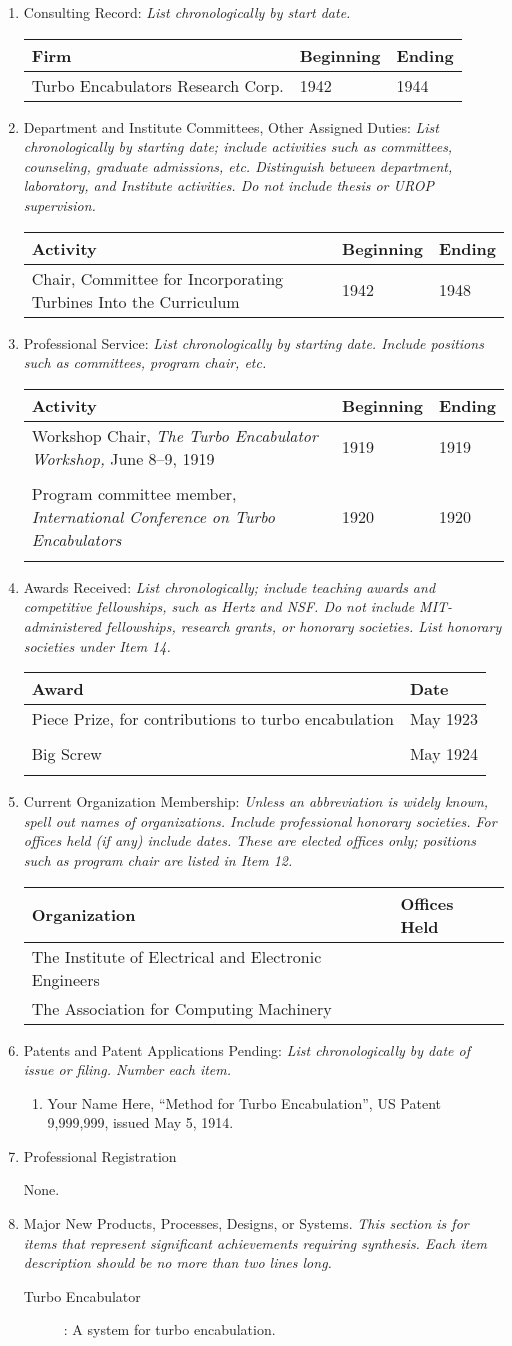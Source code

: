 \documentclass[12pt]{article}
\newcommand{\consultingrecord}{
%
Turbo Encabulators Research Corp. & 1942 & 1944 \\
}
\newcommand{\mitservice}{
Chair, Committee for Incorporating Turbines Into the Curriculum & 1942 & 1948 \\
}
\newcommand{\profservice}{

Workshop Chair, {\em The Turbo Encabulator Workshop,} June 8--9, 1919 & 1919 & 1919  \\\\
Program committee member, {\em International Conference on Turbo Encabulators} & 1920 & 1920 \\\\
}
\newcommand{\awardsreceived}{
Piece Prize, for contributions to turbo encabulation & May 1923 \\\\
Big Screw & May 1924 \\\\
}
\newcommand{\organizations}{
Organization & Offices Held\\\hline%
The Institute of Electrical and Electronic Engineers & \\
The Association for Computing Machinery & \\
}
\newcommand{\patents}{
\begin{enumerate}
\item Your Name Here, ``Method for Turbo Encabulation'', US Patent 9,999,999,
  issued May 5, 1914.
\end{enumerate}

}
\newcommand{\professionalregistration}{None.}
\newcommand{\majorproducts}{
\begin{description}
\item[Turbo Encabulator]: A system for turbo encabulation.
\end{description}

}
\newcommand{\littlenote}[1]{\emph{\footnotesize #1}}
\newcommand{\standardtwotab}[1]{
\noindent
{\small
\begin{longtable}{p{3.6in}p{1.6in}}
#1
\end{longtable}
}
}
\newcommand{\standardthreetab}[1]{
\noindent
\hspace{-0.4in}
{\small
\begin{longtable}{>{\raggedright}p{4.0in}p{.9in}p{.9in}}
#1
\end{longtable}
}
}
\begin{document}
\begin{enumerate}
\item Consulting Record: \littlenote{List chronologically by start date.}

\standardthreetab{
Firm & Beginning & Ending\\\hline%
\consultingrecord}

\item Department and Institute Committees, Other Assigned Duties:
  \littlenote{List chronologically by starting date; include
  activities such as committees, counseling, graduate admissions,
  etc.  Distinguish between department, laboratory, and Institute
  activities.  Do not include thesis or UROP supervision.}

\standardthreetab{Activity & Beginning & Ending\\\hline%
\mitservice}

\item Professional Service: \littlenote{List chronologically by
  starting date.  Include positions such as committees, program chair,
  etc.}

\standardthreetab{
Activity & Beginning & Ending\\\hline%
\profservice}

\item Awards Received: \littlenote{List chronologically; include
  teaching awards and competitive fellowships, such as Hertz and NSF.
  Do not include MIT-administered fellowships, research grants, or
  honorary societies.  List honorary societies under Item 14.}

\standardtwotab{
Award & Date\\\hline%
\awardsreceived}


\item Current Organization Membership:  \littlenote{Unless an
  abbreviation is widely known, spell out names of organizations.
  Include professional honorary societies.  For offices held (if any)
  include dates.  These are elected offices only; positions such as
  program chair are listed in Item 12.}

\standardtwotab{\organizations}

\item Patents and Patent Applications Pending:  \littlenote{List
  chronologically by date of issue or filing.  Number each item.}

\makeatletter
\renewcommand\theenumii{\@arabic\c@enumii}
\makeatother
\renewcommand\labelenumii{\theenumii.}
\patents

\item Professional Registration

\professionalregistration

\item Major New Products, Processes, Designs, or Systems.
  \littlenote{This section is for items that represent significant
  achievements requiring synthesis.  Each item description should be
  no more than two lines long.}

\majorproducts
\end{enumerate}
\end{document}
